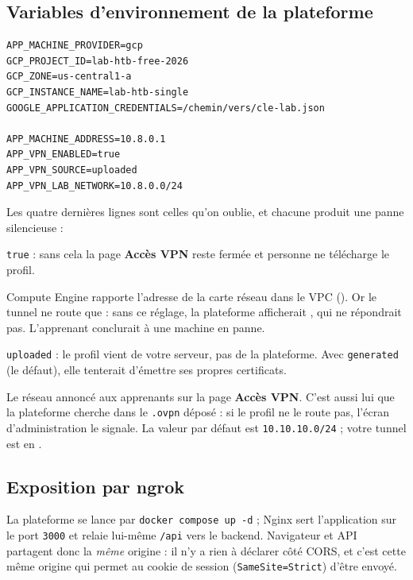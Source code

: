 \documentclass[a4paper,12pt]{article}
\begin{document}
\subsection{Variables d'environnement de la plateforme}
\label{sec:env}

\begin{lstlisting}[style=wincmd]
APP_MACHINE_PROVIDER=gcp
GCP_PROJECT_ID=lab-htb-free-2026
GCP_ZONE=us-central1-a
GCP_INSTANCE_NAME=lab-htb-single
GOOGLE_APPLICATION_CREDENTIALS=/chemin/vers/cle-lab.json

APP_MACHINE_ADDRESS=10.8.0.1
APP_VPN_ENABLED=true
APP_VPN_SOURCE=uploaded
APP_VPN_LAB_NETWORK=10.8.0.0/24
\end{lstlisting}

Les quatre dernières lignes sont celles qu'on oublie, et chacune produit une
panne silencieuse :

\begin{description}[leftmargin=2.2cm, style=nextline]
  \item[\texttt{APP\_VPN\_ENABLED}] \texttt{true} : sans cela la page
        \textbf{Accès VPN} reste fermée et personne ne télécharge le profil.
  \item[\texttt{APP\_MACHINE\_ADDRESS}] Compute Engine rapporte l'adresse de la
        carte réseau dans le VPC (). Or le tunnel ne route
        que  : sans ce réglage, la plateforme afficherait
        , qui ne répondrait pas. L'apprenant conclurait à une
        machine en panne.
  \item[\texttt{APP\_VPN\_SOURCE}] \texttt{uploaded} : le profil vient de votre
        serveur, pas de la plateforme. Avec \texttt{generated} (le défaut), elle
        tenterait d'émettre ses propres certificats.
  \item[\texttt{APP\_VPN\_LAB\_NETWORK}] Le réseau annoncé aux apprenants sur
        la page \textbf{Accès VPN}. C'est aussi lui que la plateforme cherche
        dans le \texttt{.ovpn} déposé : si le profil ne le route pas, l'écran
        d'administration le signale. La valeur par défaut est
        \texttt{10.10.10.0/24} ; votre tunnel est en .
\end{description}

\subsection{Exposition par ngrok}
\label{sec:ngrok}

La plateforme se lance par \texttt{docker compose up -d} ; Nginx sert
l'application sur le port \texttt{3000} et relaie lui-même \texttt{/api} vers
le backend. Navigateur et API partagent donc la \emph{même} origine : il n'y a
rien à déclarer côté CORS, et c'est cette même origine qui permet au cookie de
session (\texttt{SameSite=Strict}) d'être envoyé.
\end{document}
